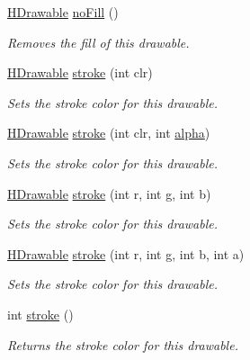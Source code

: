 \begin{DoxyCompactItemize}
\hyperlink{classhype_1_1core_1_1drawable_1_1_h_drawable}{H\-Drawable} \hyperlink{classhype_1_1core_1_1drawable_1_1_h_drawable_ad38c45d894aa73c847c64779cdb5d0c2}{no\-Fill} ()
\begin{DoxyCompactList}\small\item\em Removes the fill of this drawable. \end{DoxyCompactList}\item 
\hyperlink{classhype_1_1core_1_1drawable_1_1_h_drawable}{H\-Drawable} \hyperlink{classhype_1_1core_1_1drawable_1_1_h_drawable_ac83d29512fdfb12149aad03b9974edc0}{stroke} (int clr)
\begin{DoxyCompactList}\small\item\em Sets the stroke color for this drawable. \end{DoxyCompactList}\item 
\hyperlink{classhype_1_1core_1_1drawable_1_1_h_drawable}{H\-Drawable} \hyperlink{classhype_1_1core_1_1drawable_1_1_h_drawable_ab454a46a31c17a7d3642e2a19d372c4a}{stroke} (int clr, int \hyperlink{classhype_1_1core_1_1drawable_1_1_h_drawable_ae0711e3bde7279c84b0282f928bbe699}{alpha})
\begin{DoxyCompactList}\small\item\em Sets the stroke color for this drawable. \end{DoxyCompactList}\item 
\hyperlink{classhype_1_1core_1_1drawable_1_1_h_drawable}{H\-Drawable} \hyperlink{classhype_1_1core_1_1drawable_1_1_h_drawable_aa5fea77777a386870ab92da94f502892}{stroke} (int r, int g, int b)
\begin{DoxyCompactList}\small\item\em Sets the stroke color for this drawable. \end{DoxyCompactList}\item 
\hyperlink{classhype_1_1core_1_1drawable_1_1_h_drawable}{H\-Drawable} \hyperlink{classhype_1_1core_1_1drawable_1_1_h_drawable_a4d8f5cf55e296491fee31d41ee191896}{stroke} (int r, int g, int b, int a)
\begin{DoxyCompactList}\small\item\em Sets the stroke color for this drawable. \end{DoxyCompactList}\item 
int \hyperlink{classhype_1_1core_1_1drawable_1_1_h_drawable_aeef1c190f383562910107be8e5f80461}{stroke} ()
\begin{DoxyCompactList}\small\item\em Returns the stroke color for this drawable. \end{DoxyCompactList}\item 

\end{DoxyCompactItemize}
